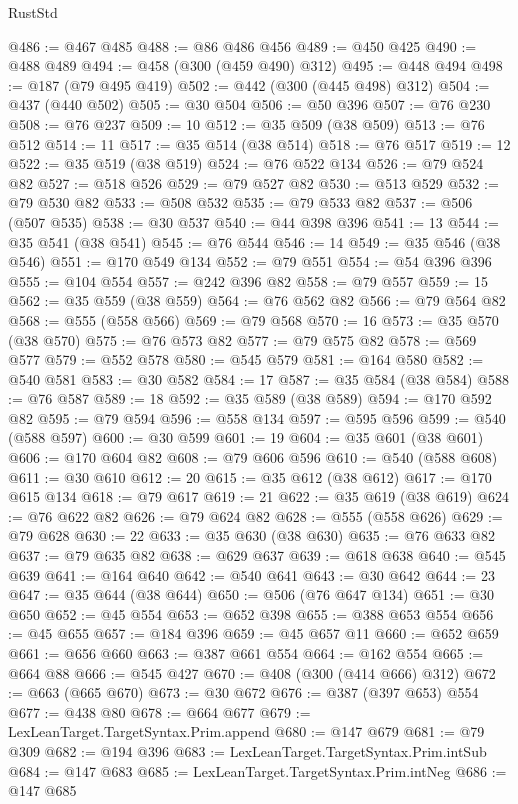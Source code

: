\begin{lexlean}{RustStd}
\begin{coremodule}
@486 := @467 @485
@488 := @86 @486 @456
@489 := @450 @425
@490 := @488 @489
@494 := @458 (@300 (@459 @490) @312)
@495 := @448 @494
@498 := @187 (@79 @495 @419)
@502 := @442 (@300 (@445 @498) @312)
@504 := @437 (@440 @502)
@505 := @30 @504
@506 := @50 @396
@507 := @76 @230
@508 := @76 @237
@509 := 10
@512 := @35 @509 (@38 @509)
@513 := @76 @512
@514 := 11
@517 := @35 @514 (@38 @514)
@518 := @76 @517
@519 := 12
@522 := @35 @519 (@38 @519)
@524 := @76 @522 @134
@526 := @79 @524 @82
@527 := @518 @526
@529 := @79 @527 @82
@530 := @513 @529
@532 := @79 @530 @82
@533 := @508 @532
@535 := @79 @533 @82
@537 := @506 (@507 @535)
@538 := @30 @537
@540 := @44 @398 @396
@541 := 13
@544 := @35 @541 (@38 @541)
@545 := @76 @544
@546 := 14
@549 := @35 @546 (@38 @546)
@551 := @170 @549 @134
@552 := @79 @551
@554 := @54 @396 @396
@555 := @104 @554
@557 := @242 @396 @82
@558 := @79 @557
@559 := 15
@562 := @35 @559 (@38 @559)
@564 := @76 @562 @82
@566 := @79 @564 @82
@568 := @555 (@558 @566)
@569 := @79 @568
@570 := 16
@573 := @35 @570 (@38 @570)
@575 := @76 @573 @82
@577 := @79 @575 @82
@578 := @569 @577
@579 := @552 @578
@580 := @545 @579
@581 := @164 @580
@582 := @540 @581
@583 := @30 @582
@584 := 17
@587 := @35 @584 (@38 @584)
@588 := @76 @587
@589 := 18
@592 := @35 @589 (@38 @589)
@594 := @170 @592 @82
@595 := @79 @594
@596 := @558 @134
@597 := @595 @596
@599 := @540 (@588 @597)
@600 := @30 @599
@601 := 19
@604 := @35 @601 (@38 @601)
@606 := @170 @604 @82
@608 := @79 @606 @596
@610 := @540 (@588 @608)
@611 := @30 @610
@612 := 20
@615 := @35 @612 (@38 @612)
@617 := @170 @615 @134
@618 := @79 @617
@619 := 21
@622 := @35 @619 (@38 @619)
@624 := @76 @622 @82
@626 := @79 @624 @82
@628 := @555 (@558 @626)
@629 := @79 @628
@630 := 22
@633 := @35 @630 (@38 @630)
@635 := @76 @633 @82
@637 := @79 @635 @82
@638 := @629 @637
@639 := @618 @638
@640 := @545 @639
@641 := @164 @640
@642 := @540 @641
@643 := @30 @642
@644 := 23
@647 := @35 @644 (@38 @644)
@650 := @506 (@76 @647 @134)
@651 := @30 @650
@652 := @45 @554
@653 := @652 @398
@655 := @388 @653 @554
@656 := @45 @655
@657 := @184 @396
@659 := @45 @657 @11
@660 := @652 @659
@661 := @656 @660
@663 := @387 @661 @554
@664 := @162 @554
@665 := @664 @88
@666 := @545 @427
@670 := @408 (@300 (@414 @666) @312)
@672 := @663 (@665 @670)
@673 := @30 @672
@676 := @387 (@397 @653) @554
@677 := @438 @80
@678 := @664 @677
@679 := LexLeanTarget.TargetSyntax.Prim.append
@680 := @147 @679
@681 := @79 @309
@682 := @194 @396
@683 := LexLeanTarget.TargetSyntax.Prim.intSub
@684 := @147 @683
@685 := LexLeanTarget.TargetSyntax.Prim.intNeg
@686 := @147 @685

\end{coremodule}
\end{lexlean}
